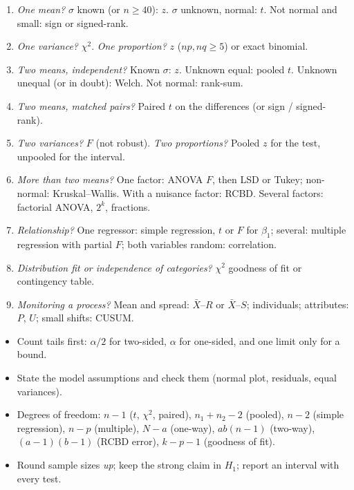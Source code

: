 \begin{enumerate}
  \item \emph{One mean?} $\sigma$ known (or $n\ge40$): $z$. $\sigma$ unknown, normal: $t$. Not normal and small: sign or signed-rank.
  \item \emph{One variance?} $\chi^2$. \emph{One proportion?} $z$ ($np,nq\ge5$) or exact binomial.
  \item \emph{Two means, independent?} Known $\sigma$: $z$. Unknown equal: pooled $t$. Unknown unequal (or in doubt): Welch. Not normal: rank-sum.
  \item \emph{Two means, matched pairs?} Paired $t$ on the differences (or sign / signed-rank).
  \item \emph{Two variances?} $F$ (not robust). \emph{Two proportions?} Pooled $z$ for the test, unpooled for the interval.
  \item \emph{More than two means?} One factor: ANOVA $F$, then LSD or Tukey; non-normal: Kruskal--Wallis. With a nuisance factor: RCBD. Several factors: factorial ANOVA, $2^k$, fractions.
  \item \emph{Relationship?} One regressor: simple regression, $t$ or $F$ for $\beta_1$; several: multiple regression with partial $F$; both variables random: correlation.
  \item \emph{Distribution fit or independence of categories?} $\chi^2$ goodness of fit or contingency table.
  \item \emph{Monitoring a process?} Mean and spread: $\bar{X}$--$R$ or $\bar{X}$--$S$; individuals; attributes: $P$, $U$; small shifts: CUSUM.
\end{enumerate}

\begin{summarybox}
\begin{itemize}
  \item Count tails first: $\alpha/2$ for two-sided, $\alpha$ for one-sided, and one limit only for a bound.
  \item State the model assumptions and check them (normal plot, residuals, equal variances).
  \item Degrees of freedom: $n-1$ ($t$, $\chi^2$, paired), $n_1+n_2-2$ (pooled), $n-2$ (simple regression), $n-p$ (multiple), $N-a$ (one-way), $ab(n-1)$ (two-way), $(a-1)(b-1)$ (RCBD error), $k-p-1$ (goodness of fit).
  \item Round sample sizes \emph{up}; keep the strong claim in $H_1$; report an interval with every test.
\end{itemize}
\end{summarybox}
